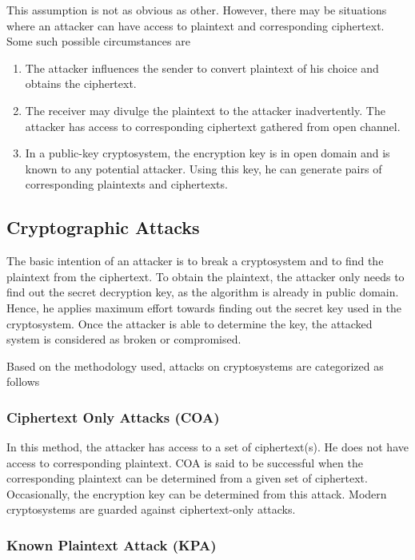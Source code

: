 \documentclass[british]{article}
\begin{document}
\begin{enumerate}
This assumption is not as obvious as other. However, there may be
situations where an attacker can have access to plaintext and corresponding
ciphertext. Some such possible circumstances are \textminus{} 
\begin{enumerate}
\item The attacker influences the sender to convert plaintext of his choice
and obtains the ciphertext. 
\item The receiver may divulge the plaintext to the attacker inadvertently.
The attacker has access to corresponding ciphertext gathered from
open channel. 
\item In a public-key cryptosystem, the encryption key is in open domain
and is known to any potential attacker. Using this key, he can generate
pairs of corresponding plaintexts and ciphertexts.
\end{enumerate}
\end{enumerate}
\vfill{}

\pagebreak{}

\subsection{Cryptographic Attacks}

The basic intention of an attacker is to break a cryptosystem and
to find the plaintext from the ciphertext. To obtain the plaintext,
the attacker only needs to find out the secret decryption key, as
the algorithm is already in public domain. Hence, he applies maximum
effort towards finding out the secret key used in the cryptosystem.
Once the attacker is able to determine the key, the attacked system
is considered as broken or compromised.

Based on the methodology used, attacks on cryptosystems are categorized
as follows \textminus{}

\subsubsection{Ciphertext Only Attacks (COA) }

In this method, the attacker has access to a set of ciphertext(s).
He does not have access to corresponding plaintext. COA is said to
be successful when the corresponding plaintext can be determined from
a given set of ciphertext. Occasionally, the encryption key can be
determined from this attack. Modern cryptosystems are guarded against
ciphertext-only attacks.

\subsubsection{Known Plaintext Attack (KPA)}
\end{document}
